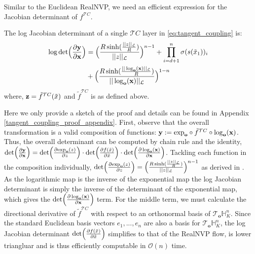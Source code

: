 Similar to the Euclidean RealNVP, we need an efficient expression for the Jacobian determinant of $f^{\mathcal{T}C}$.
\begin{prop}
The log Jacobian determinant of a single $\mathcal{T}C$ layer in \eqref{eq:tangent_coupling} is:
\begin{align}
\cut{
    \textnormal{det}\Big (\frac{\partial \textbf{y}}{\partial \textbf{x}}\Big) =  \textnormal{det}\Big (\frac{\partial \textnormal{exp}_{\textbf{o}}(z)}{\partial z}\Big) \cdot \textnormal{det}\Big (\frac{\partial f(\tilde{x})}{\partial \tilde{x}}\Big) \cdot  \textnormal{det}\Big (\frac{\partial \log_{\textbf{o}}(\textbf{x})}{\partial \textbf{x}}\Big)
    }
     \log \textnormal{det}\Big (\frac{\partial \textbf{y}}{\partial \textbf{x}}\Big) &= \Big(\frac{R\sinh(\frac{||z||_{\mathcal{L}}}{R})}{||z||_{\mathcal{L}}}\Big)^{n-1} + \prod_{i=d+1}^n\sigma(s(\tilde{x}_1))_i  \nonumber\\
     & + \Big(\frac{R\sinh(\frac{||\log_{\textbf{o}}(\textbf{x})||_{\mathcal{L}}}{R})}{||\log_{\textbf{o}}(\textbf{x})||_{\mathcal{L}}}\Big)^{1-n}
\end{align}
where, $ \mathbf{z} =  \tilde{f}^{\mathcal{T}C}(\tilde{x})$ and $\tilde{f}^{\mathcal{T}C}$ is as defined above.
\end{prop}
\begin{proofsketch}
Here we only provide a sketch of the proof and details can be found in Appendix \ref{tangent_coupling_proof_appendix}. First, observe  that the overall transformation  is a valid composition of functions: $\mathbf{y} := \textnormal{exp}_{\textbf{o}} \circ \tilde{f}^{\mathcal{T}C} \circ \log_{\textbf{o}}(\textbf{x})$. Thus, the overall determinant can be computed by chain rule and the identity,  $\textnormal{det}\Big (\frac{\partial \textbf{y}}{\partial \textbf{x}}\Big) =  \textnormal{det}\Big (\frac{\partial \textnormal{exp}_{\textbf{o}}(z)}{\partial z}\Big) \cdot \textnormal{det}\Big (\frac{\partial f(\tilde{x})}{\partial \tilde{x}}\Big) \cdot  \textnormal{det}\Big (\frac{\partial \log_{\textbf{o}}(\textbf{x})}{\partial \textbf{x}}\Big)$. Tackling each function in the composition individually, $\textnormal{det}\Big (\frac{\partial \textnormal{exp}_{\textbf{o}}(z)}{\partial z}\Big) = \Big(\frac{R\sinh(\frac{||z||_{\mathcal{L}}}{R})}{||z||_{\mathcal{L}}}\Big)^{n-1}$ as derived in \cite{skopek2019mixed}. As the logarithmic map is the inverse of the exponential map the log Jacobian determinant is simply the inverse of the determinant of the exponential map, which gives the $\textnormal{det}\Big (\frac{\partial \log_{\textbf{o}}(\textbf{x})}{\partial \textbf{x}}\Big)$ term. 
For the middle term, we must calculate the directional derivative of $\tilde{f}^{\mathcal{T}C}$ with respect to an orthonormal basis of $\mathcal{T}_{\textbf{o}}\mathbb{H}^{n}_K$. Since the standard Euclidean basis vectors $e_1, ..., e_n$ are also a basis for $\mathcal{T}_{\textbf{o}}\mathbb{H}^{n}_K$, the log Jacobian determinant $\textnormal{det}\Big (\frac{\partial f(\tilde{x})}{\partial \tilde{x}}\Big)$ simplifies to that of the RealNVP flow, is lower triangluar and is thus efficiently computable in $\mathcal{O}(n)$ time.

\end{proofsketch}
